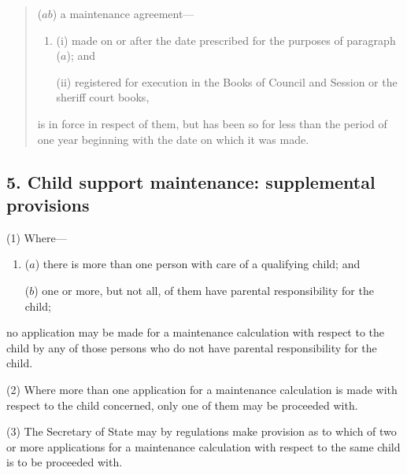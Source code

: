 \documentclass[12pt,a4paper]{article}
\begin{document}
{\begin{quotation}
\begin{enumerate}
($ab$) a
maintenance agreement---
\begin{enumerate}\item[]
(i)
made on or after the date prescribed for the purposes of paragraph ($a$);
and

(ii)
registered for execution in the Books of Council and Session or the
sheriff court books,
\end{enumerate}
is in force in respect of them, but has been so for less than the period of one year
beginning with the date on which it was made.
\end{enumerate}
\end{quotation}

}

\subsection{5. Child support
maintenance:
supplemental
provisions}

(1)
Where---
\begin{enumerate}\item[]
($a$)
there is more than one person with care of a qualifying child; and

($b$)
one or more, but not all, of them have parental responsibility for 
the child;
\end{enumerate}
no application may be made for a maintenance calculation
with respect to the child by any of those persons who do not have parental responsibility
for 
the child.

(2)
Where more than one application for a maintenance calculation
is made with respect to the child concerned, only one of them may be
proceeded with.

(3)
The Secretary of State may by regulations make provision as to which of
two or more applications for a maintenance calculation
with respect to the same child is to be proceeded with. 

\end{document}
